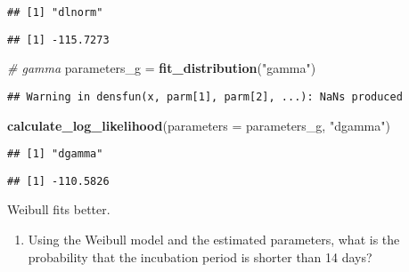 \documentclass[
]{article}
\newenvironment{Shaded}{\begin{snugshade}}{\end{snugshade}}
\newcommand{\CommentTok}[1]{\textcolor[rgb]{0.56,0.35,0.01}{\textit{#1}}}
\newcommand{\DataTypeTok}[1]{\textcolor[rgb]{0.13,0.29,0.53}{#1}}
\newcommand{\DecValTok}[1]{\textcolor[rgb]{0.00,0.00,0.81}{#1}}
\newcommand{\KeywordTok}[1]{\textcolor[rgb]{0.13,0.29,0.53}{\textbf{#1}}}
\newcommand{\NormalTok}[1]{#1}
\newcommand{\OperatorTok}[1]{\textcolor[rgb]{0.81,0.36,0.00}{\textbf{#1}}}
\newcommand{\StringTok}[1]{\textcolor[rgb]{0.31,0.60,0.02}{#1}}
\providecommand{\tightlist}{%
  \setlength{\itemsep}{0pt}\setlength{\parskip}{0pt}}
\begin{document}
\begin{verbatim}
## [1] "dlnorm"
\end{verbatim}

\begin{verbatim}
## [1] -115.7273
\end{verbatim}

\begin{Shaded}
\begin{Highlighting}[]
\CommentTok{# gamma}
\NormalTok{parameters_g =}\StringTok{ }\KeywordTok{fit_distribution}\NormalTok{(}\StringTok{"gamma"}\NormalTok{)}
\end{Highlighting}
\end{Shaded}

\begin{verbatim}
## Warning in densfun(x, parm[1], parm[2], ...): NaNs produced
\end{verbatim}

\begin{Shaded}
\begin{Highlighting}[]
\KeywordTok{calculate_log_likelihood}\NormalTok{(}\DataTypeTok{parameters =}\NormalTok{ parameters_g, }\StringTok{"dgamma"}\NormalTok{)}
\end{Highlighting}
\end{Shaded}

\begin{verbatim}
## [1] "dgamma"
\end{verbatim}

\begin{verbatim}
## [1] -110.5826
\end{verbatim}

Weibull fits better.

\begin{enumerate}
\def\labelenumi{(\arabic{enumi})}
\setcounter{enumi}{2}
\tightlist
\item
  Using the Weibull model and the estimated parameters, what is the
  probability that the incubation period is shorter than 14 days?
\end{enumerate}

\begin{Shaded}
\end{Shaded}
\end{document}
